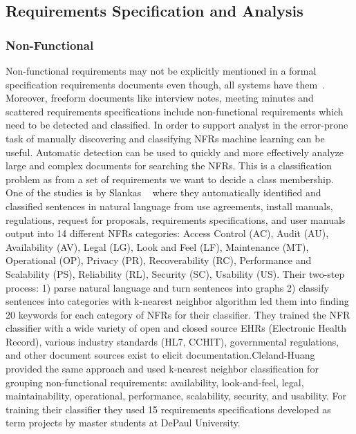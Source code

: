 \subsection{Requirements Specification and Analysis}

\subsubsection{Non-Functional}

Non-functional requirements may not be explicitly mentioned in a formal
specification requirements documents even though, all systems have
them~\cite{Slankas:2013}. Moreover, freeform documents like interview notes,
meeting minutes and scattered requirements specifications include non-functional
requirements which need to be detected and classified. In order to support
analyst in the error-prone task of manually discovering and classifying NFRs
machine learning can be useful. Automatic detection can be used to quickly and
more effectively analyze large and complex documents for searching the
NFRs\cite{Cleland-Huang2007}. This is a classification problem as from a set of
requirements we want to decide a class membership. \\

One of the studies is by Slankas \etal~\cite{Slankas:2013} where they
automatically identified and classified sentences in natural language from use
agreements, install manuals, regulations, request for proposals, requirements
specifications, and user manuals output into 14 different NFRs categories:
Access Control (AC), Audit (AU), Availability (AV), Legal (LG), Look and Feel
(LF), Maintenance (MT), Operational (OP), Privacy (PR), Recoverability (RC),
Performance and Scalability (PS), Reliability (RL), Security (SC), Usability
(US). Their two-step process: 1) parse natural language and turn sentences into
graphs 2) classify sentences into categories with k-nearest neighbor algorithm
led them into finding 20 keywords for each category of NFRs for their
classifier. They trained the NFR classifier with a wide variety of open and
closed source EHRs (Electronic Health Record), various industry standards (HL7,
CCHIT), governmental regulations, and other document sources exist to elicit
documentation.\newline Cleland-Huang \etal~\cite{Cleland-Huang2007} provided the
same approach and used k-nearest neighbor classification for grouping
non-functional requirements: availability, look-and-feel, legal,
maintainability, operational, performance, scalability, security, and usability.
For training their classifier they used 15 requirements specifications developed
as term projects by master students at DePaul University.


